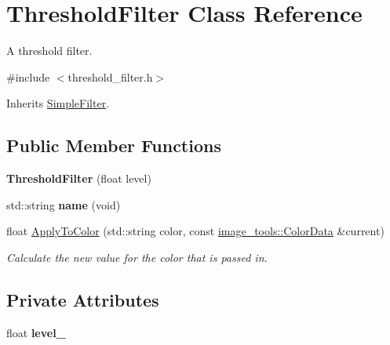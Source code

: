 \hypertarget{classThresholdFilter}{}\section{Threshold\+Filter Class Reference}
\label{classThresholdFilter}


A threshold filter.  




{\ttfamily \#include $<$threshold\+\_\+filter.\+h$>$}



Inherits \hyperlink{classSimpleFilter}{Simple\+Filter}.

\subsection*{Public Member Functions}
\begin{DoxyCompactItemize}
\item 
{\bfseries Threshold\+Filter} (float level)\hypertarget{classThresholdFilter_a93f9726e62fe176c6f37495de2233603}{}\label{classThresholdFilter_a93f9726e62fe176c6f37495de2233603}

\item 
std\+::string {\bfseries name} (void)\hypertarget{classThresholdFilter_aa3fbceaf9802b862631ef554e4f995a2}{}\label{classThresholdFilter_aa3fbceaf9802b862631ef554e4f995a2}

\item 
float \hyperlink{classThresholdFilter_a05992cf3b35d05507690521876c77fa4}{Apply\+To\+Color} (std\+::string color, const \hyperlink{classimage__tools_1_1ColorData}{image\+\_\+tools\+::\+Color\+Data} \&current)
\begin{DoxyCompactList}\small\item\em Calculate the new value for the color that is passed in. \end{DoxyCompactList}\end{DoxyCompactItemize}
\subsection*{Private Attributes}
\begin{DoxyCompactItemize}
\item 
float {\bfseries level\+\_\+}\hypertarget{classThresholdFilter_af63a9dc4b7bbfb05d0f04b5e64dc3dc4}{}\label{classThresholdFilter_af63a9dc4b7bbfb05d0f04b5e64dc3dc4}

\end{DoxyCompactItemize}


